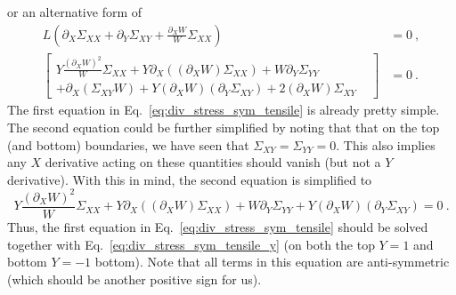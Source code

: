 \documentclass[12pt,a4paper]{article}
\begin{document}
or an alternative form of
\begin{equation}\label{eq:div_stress_boundary_sym_tensile_1}
  \begin{split}
    L\left(\partial_X\Sigma_{XX} + \partial_Y\Sigma_{XY} + \frac{\partial_X W}{W} \Sigma_{XX}\right) & = 0 \ , \\
    \left[\begin{split}
       Y\frac{\left(\partial_X W\right)^2}{W}\Sigma_{XX} + Y \partial_X \left(\left(\partial_X W\right) \Sigma_{XX}\right) +  W\partial_Y\Sigma_{YY} &  \\
       + \partial_X\left(\Sigma_{XY} W \right) + Y\left(\partial_X W\right)\left( \partial_Y \Sigma_{XY}\right) + 2 \left(\partial_X W\right)\Sigma_{XY}    &
    \end{split}\right]  & = 0 \ .
  \end{split}
\end{equation}
The first equation in Eq.~\eqref{eq:div_stress_sym_tensile} is already pretty simple. The second equation could be further simplified by noting that that on the top (and bottom) boundaries, we have seen that $\Sigma_{XY}=\Sigma_{YY}=0$. This also implies any $X$ derivative acting on these quantities should vanish (but not a $Y$ derivative).
With this in mind, the second equation is simplified to
\begin{equation}\label{eq:div_stress_sym_tensile_y}
  Y\frac{\left(\partial_X W\right)^2}{W}\Sigma_{XX} + Y \partial_X \left(\left(\partial_X W\right) \Sigma_{XX}\right) +  W\partial_Y\Sigma_{YY} + Y\left(\partial_X W\right)\left( \partial_Y \Sigma_{XY}\right)  = 0 \ .
\end{equation}
Thus, the first equation in Eq.~\eqref{eq:div_stress_sym_tensile} should be solved together with Eq.~\eqref{eq:div_stress_sym_tensile_y} (on both the top $Y=1$ and bottom $Y=-1$ bottom). Note that all terms in this equation are anti-symmetric (which should be another positive sign for us).
\end{document}
